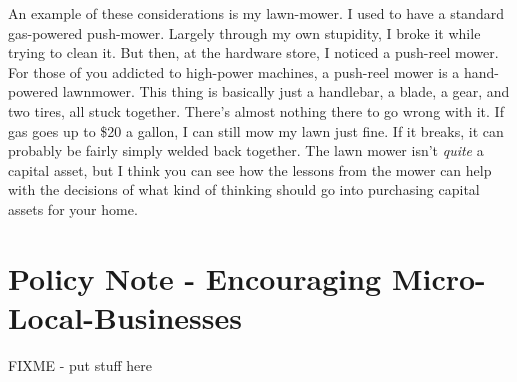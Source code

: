 An example of these considerations is my lawn-mower. I used to have a
standard gas-powered push-mower. Largely through my own stupidity, I
broke it while trying to clean it. But then, at the hardware store, I
noticed a push-reel mower. For those of you addicted to high-power
machines, a push-reel mower is a hand-powered lawnmower. This thing is
basically just a handlebar, a blade, a gear, and two tires, all stuck
together. There’s almost nothing there to go wrong with it. If gas goes
up to \$20 a gallon, I can still mow my lawn just fine.  If it breaks,
it can probably be fairly simply welded back together. The lawn mower
isn’t \textit{quite} a capital asset, but I think you can see how the
lessons from the mower can help with the decisions of what kind of
thinking should go into purchasing capital assets for your home.

\section{Policy Note - Encouraging Micro-Local-Businesses}

FIXME - put stuff here
